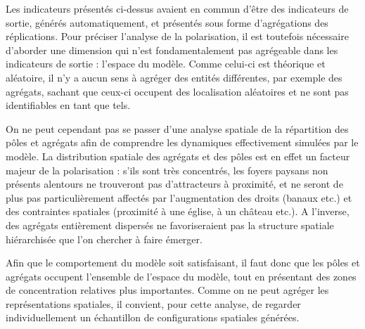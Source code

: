 Les indicateurs présentés ci-dessus avaient en commun d'être des indicateurs de sortie, générés automatiquement, et présentés sous forme d'agrégations des réplications.
Pour préciser l'analyse de la polarisation, il est toutefois nécessaire d'aborder une dimension qui n'est fondamentalement pas agrégeable dans les indicateurs de sortie :
l'espace du modèle.
Comme celui-ci est théorique et aléatoire, il n'y a aucun sens à agréger des entités différentes, par exemple des agrégats, sachant que ceux-ci occupent des localisation aléatoires et ne sont pas identifiables en tant que tels.

On ne peut cependant pas se passer d'une analyse spatiale de la répartition des pôles et agrégats afin de comprendre les dynamiques effectivement simulées par le modèle.
La distribution spatiale des agrégats et des pôles est en effet un facteur majeur de la polarisation :
s'ils sont très concentrés, les foyers paysans non présents alentours ne trouveront pas d'attracteurs à proximité, et ne seront de plus pas particulièrement affectés par l'augmentation des droits (banaux etc.) et des contraintes spatiales (proximité à une église, à un château etc.).
A l'inverse, des agrégats entièrement dispersés ne favoriseraient pas la structure spatiale hiérarchisée que l'on chercher à faire émerger.

Afin que le comportement du modèle soit satisfaisant, il faut donc que les pôles et agrégats occupent l'ensemble de l'espace du modèle, tout en présentant des zones de concentration relatives plus importantes.
Comme on ne peut agréger les représentations spatiales, il convient, pour cette analyse, de regarder individuellement un échantillon de configurations spatiales générées.


